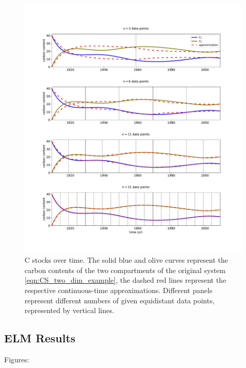 \documentclass[11pt,a4paper]{article}
\begin{document}
    \begin{figure}[htbp]
        \centering 
        \includegraphics[width=1.0\linewidth]{figs/interpol_pwc_2.pdf}
        \caption{C stocks over time.
            The solid blue and olive curves represent the carbon contents of the two compartments of the original system \eqref{eqn:CS_two_dim_example}, the dashed red lines represent the respective continuous-time approximations.
            Different panels represent different numbers of given equidistant data points, represented by vertical lines.
            }
        \label{fig:CS_two_dim_example}
    \end{figure}        

\subsection{ELM Results}
Figures:

\end{document}
